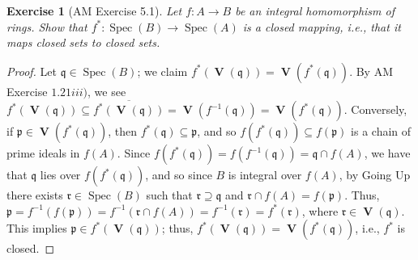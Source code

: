 \documentclass[12pt,letterpaper]{article}
\newtheorem{problem}{Exercise}[section]
\theoremstyle{definition}
\theoremstyle{remark}
\numberwithin{figure}{problem}
\numberwithin{equation}{section}
\DeclareMathOperator{\Spec}{Spec}
\DeclareMathOperator{\V}{\mathbf{V}}
\begin{document}
\begin{problem}[AM Exercise 5.1]
  Let $f: A \to B$ be an integral homomorphism of rings. Show that $f^* : \Spec(B) \to \Spec(A)$ is a \emph{closed} mapping, i.e., that it maps closed sets to closed sets.
\end{problem}
\begin{proof}
  Let $\mathfrak{q} \in \Spec(B)$; we claim $f^*(\V(\mathfrak{q})) = \V(f^*(\mathfrak{q}))$. By AM Exercise $1.21iii)$, we see $f^*(\V(\mathfrak{q})) \subseteq \overline{f^*(\V(\mathfrak{q}))} = \V(f^{-1}(\mathfrak{q})) = \V(f^*(\mathfrak{q}))$. Conversely, if $\mathfrak{p} \in \V(f^*(\mathfrak{q}))$, then $f^*(\mathfrak{q}) \subseteq \mathfrak{p}$, and so $f(f^*(\mathfrak{q})) \subseteq f(\mathfrak{p})$ is a chain of prime ideals in $f(A)$. Since $f(f^*(\mathfrak{q})) = f(f^{-1}(\mathfrak{q})) = \mathfrak{q} \cap f(A)$, we have that $\mathfrak{q}$ lies over $f(f^*(\mathfrak{q}))$, and so since $B$ is integral over $f(A)$, by Going Up there exists $\mathfrak{r} \in \Spec(B)$ such that $\mathfrak{r} \supseteq \mathfrak{q}$ and $\mathfrak{r} \cap f(A) = f(\mathfrak{p})$. Thus, $\mathfrak{p} = f^{-1}(f(\mathfrak{p})) = f^{-1}(\mathfrak{r} \cap f(A)) = f^{-1}(\mathfrak{r}) = f^*(\mathfrak{r})$, where $\mathfrak{r} \in \V(\mathfrak{q})$. This implies $\mathfrak{p} \in f^*(\V(\mathfrak{q}))$; thus, $f^*(\V(\mathfrak{q})) = \V(f^*(\mathfrak{q}))$, i.e., $f^*$ is closed.
\end{proof}
\end{document}
